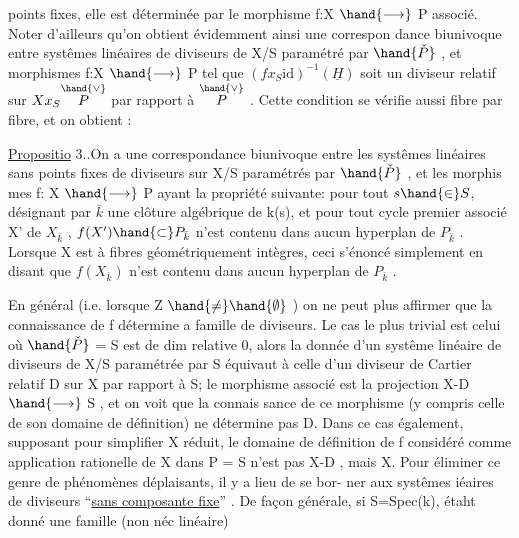 
points fixes, elle est déterminée  par le morphisme f:X $\hand{\longrightarrow}$ P
associé. Noter d'ailleurs qu'on obtient évidemment ainsi une correspon
dance biunivoque entre systêmes linéaires de diviseurs de X/S paramétré
par $\hand{\check{P}}$ , et morphismes f:X $\hand{\longrightarrow}$ P tel que $(fx_S\mathrm{id})^{-1}(\underline{H})$ soit un
diviseur  relatif sur $Xx_S\overset{\hand{\vee}}{P}$ par rapport à $\overset{\hand{\vee}}{P}$ . Cette  condition
se vérifie aussi fibre par fibre, et on obtient :

\uline{Propositio} 3..On a une correspondance biunivoque entre les 
systêmes linéaires sans points fixes de diviseurs sur X/S paramétrés par $\hand{\check{P}}$ , et les morphis
mes f: X $\hand{\longrightarrow}$ P ayant la propriété suivante: pour tout $s\hand{\in} S$, désignant
par $\bar{k}$ une clôture algébrique de k(s), et pour tout cycle premier associé
X' de $X_{\bar{k}}$ , $f(X')\hand{\subset} P_{\bar{k}}$ n'est contenu dans aucun hyperplan de $P_{\bar{k}}$ .
\hand{(}Lorsque X est à fibres géométriquement  intègres, ceci 
 s'énoncé simplement en disant que $f(X_{\bar{k}})$ n'est contenu dans aucun
hyperplan de $P_{\bar{k}}$ \hand{)}.

En général (i.e.  lorsque Z $\hand{\neq}\hand{\emptyset}$ ) on ne peut plus affirmer que
la connaissance de f détermine a famille de diviseurs. Le cas le plus
trivial est celui où $\hand{\check{P}}$ = S est de dim relative 0, alors la donnée d'un systême linéaire de
diviseurs de X/S paramétrée par S équivaut à celle d'un diviseur de
Cartier relatif D sur X par rapport à S;  le morphisme
associé est la projection X-D $\hand{\longrightarrow}$ S , et on voit  que la connais
sance de ce morphisme (y compris celle de son domaine de définition)
ne détermine pas D. Dans ce cas également, supposant pour simplifier X
réduit, le domaine de définition de  f  considéré
comme application rationelle de X dans P = S n'est pas X-D , mais X.
Pour éliminer ce genre de phénomènes déplaisants, il y a lieu de se bor-%
ner aux systêmes iéaires de diviseurs ``\uline{sans composante fixe}'' . De
façon générale, si S=Spec(k), étaht donné une famille (non néc linéaire)

